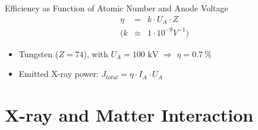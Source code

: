 \begin{frame}[c]{Efficiency as Function of Atomic Number and Anode Voltage}
    \centering
    \begin{eqnarray*}
        \eta&=& k \cdot U_A \cdot Z\\
        ( k&\approx& 1 \cdot 10^{-9} V^{-1} )
        \label{eq:efficient}
    \end{eqnarray*}


    \vskip36pt
    \begin{itemize}
        \item Tungsten ($Z=74$), with $U_A=100 \text{ kV}$ $\Rightarrow$ $\eta=0.7 \ \%$
        \item Emitted X-ray power: 	$J_{total}=\eta\cdot I_A \cdot U_A$
    \end{itemize}
\end{frame}

\subtitle{X-Ray - Part 2}
\frame[plain,c]{\titlepage} %



\section{X-ray and Matter Interaction}


